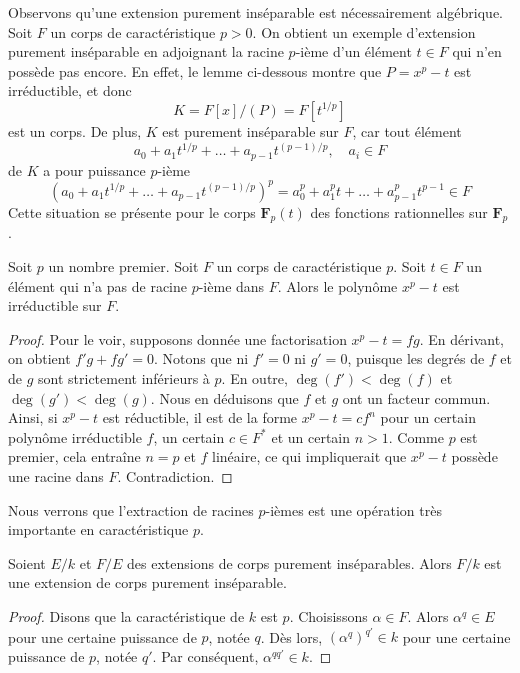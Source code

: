 \noindent
Observons qu'une extension purement inséparable est nécessairement algébrique.
Soit $F$ un corps de caractéristique $p > 0$.
On obtient un exemple d'extension purement inséparable en adjoignant
la racine $p$-ième d'un élément $t \in F$ qui n'en possède pas encore. En effet,
le lemme ci-dessous montre que $P = x^p - t$ est irréductible, et donc
$$
K = F[x]/(P) = F[t^{1/p}]
$$
est un corps. De plus, $K$ est purement inséparable sur $F$, car tout élément
$$
a_0 + a_1t^{1/p} + \ldots + a_{p - 1}t^{(p - 1)/p},\quad a_i \in F
$$
de $K$ a pour puissance $p$-ième
$$
(a_0 + a_1t^{1/p} + \ldots + a_{p - 1}t^{(p - 1)/p})^p =
a_0^p + a_1^p t + \ldots + a_{p - 1}^pt^{p - 1} \in F
$$
Cette situation se présente pour le corps
$\mathbf{F}_p(t)$ des fonctions rationnelles sur $\mathbf{F}_p$.

\begin{lemma}
\label{lemma-take-pth-root}
Soit $p$ un nombre premier. Soit $F$ un corps de caractéristique $p$.
Soit $t \in F$ un élément qui n'a pas de racine $p$-ième dans $F$.
Alors le polynôme $x^p - t$ est irréductible sur $F$.
\end{lemma}

\begin{proof}
Pour le voir, supposons donnée une factorisation
$x^p - t = f g$. En dérivant, on obtient $f' g + f g' = 0$.
Notons que ni $f' = 0$ ni $g' = 0$, puisque les degrés de $f$ et de $g$
sont strictement inférieurs à $p$. En outre, $\deg(f') < \deg(f)$ et $\deg(g') < \deg(g)$.
Nous en déduisons que $f$ et $g$ ont un facteur commun. Ainsi, si $x^p - t$
est réductible, il est de la forme $x^p - t = c f^n$ pour un certain polynôme
irréductible $f$, un certain $c \in F^*$ et un certain $n > 1$. Comme $p$ est premier,
cela entraîne $n = p$ et $f$ linéaire, ce qui impliquerait que $x^p - t$ possède
une racine dans $F$. Contradiction.
\end{proof}

\noindent
Nous verrons que l'extraction de racines $p$-ièmes est une opération très importante
en caractéristique $p$.

\begin{lemma}
\label{lemma-purely-inseparable-permanence}
Soient $E/k$ et $F/E$ des extensions de corps purement inséparables. Alors $F/k$
est une extension de corps purement inséparable.
\end{lemma}

\begin{proof}
Disons que la caractéristique de $k$ est $p$. Choisissons $\alpha \in F$. Alors
$\alpha^q \in E$ pour une certaine puissance de $p$, notée $q$. Dès lors, $(\alpha^q)^{q'} \in k$
pour une certaine puissance de $p$, notée $q'$. Par conséquent, $\alpha^{qq'} \in k$.
\end{proof}

